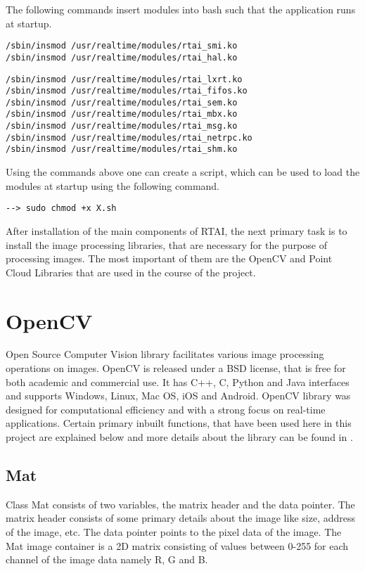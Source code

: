 The following commands insert modules into bash such that the application runs at startup.
\begin{lstlisting}
/sbin/insmod /usr/realtime/modules/rtai_smi.ko
/sbin/insmod /usr/realtime/modules/rtai_hal.ko
\end{lstlisting}
\pagebreak
\begin{lstlisting}
/sbin/insmod /usr/realtime/modules/rtai_lxrt.ko
/sbin/insmod /usr/realtime/modules/rtai_fifos.ko
/sbin/insmod /usr/realtime/modules/rtai_sem.ko
/sbin/insmod /usr/realtime/modules/rtai_mbx.ko
/sbin/insmod /usr/realtime/modules/rtai_msg.ko
/sbin/insmod /usr/realtime/modules/rtai_netrpc.ko
/sbin/insmod /usr/realtime/modules/rtai_shm.ko 
\end{lstlisting}
Using the commands above one can create a script, which can be used to load the modules at startup using the following command.
\begin{lstlisting}
--> sudo chmod +x X.sh 
\end{lstlisting}
After installation of the main components of RTAI, the next primary task is to install the image processing libraries, that are necessary for the purpose of processing images. The most important of them are the OpenCV and Point Cloud Libraries that are used in the course of the project.
\section{OpenCV}
\label{sec:OpenCV}
Open Source Computer Vision library facilitates various image processing operations on images. OpenCV is released under a BSD license, that is free for both academic and commercial use. It has C++, C, Python and Java interfaces and supports Windows, Linux, Mac OS, iOS and Android. OpenCV library was designed for computational efficiency and with a strong focus on real-time applications. Certain primary inbuilt functions, that have been used here in this project are explained below and more details about the library can be found in \cite{bradski2008learning}.

\subsection{Mat}
\label{sec:Mat}
Class Mat consists of two variables, the matrix header and the data pointer. The matrix header consists of some primary details about the image like size, address of the image, etc. The data pointer points to the pixel data of the image. The Mat image container is a 2D matrix consisting of values between 0-255 for each channel of the image data namely R, G and B. 
